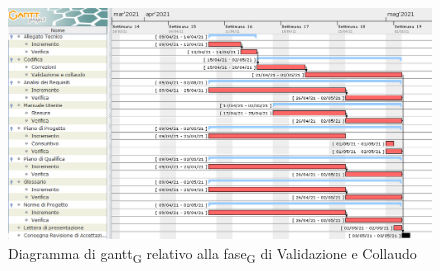 \begin{figure}[H]
	\centering
	\includegraphics[scale=0.51]{res/images/06_gantt_validazione}
	\caption{Diagramma di \gls{gantt}\textsubscript{G} relativo alla \gls{fase}\textsubscript{G} di Validazione e Collaudo}
\end{figure}